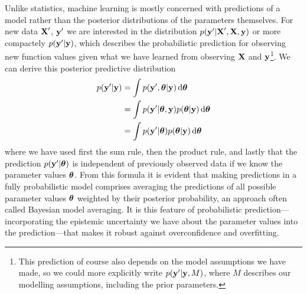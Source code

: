 \documentclass[../thesis.tex]{subfiles}
\begin{document}
Unlike statistics, machine learning is mostly concerned with predictions of a model rather than the posterior distributions of the parameters themselves. For new data $\boldsymbol{\mathbf{X}}'$, $\boldsymbol{\mathbf{y}}'$ we are interested in the distribution $p(\boldsymbol{\mathbf{y}}' | \boldsymbol{\mathbf{X}}', \boldsymbol{\mathbf{X}}, \boldsymbol{\mathbf{y}})$ or more compactely $p(\boldsymbol{\mathbf{y}}' | \boldsymbol{\mathbf{y}})$, which describes the probabilistic prediction for observing new function values given what we have learned from observing $\boldsymbol{\mathbf{X}}$ and $\boldsymbol{\mathbf{y}}$\footnote{This prediction of course also depends on the model assumptions we have made, so we could more explicitly write $p(\boldsymbol{\mathbf{y}}' | \boldsymbol{\mathbf{y}}, M)$, where $M$ describes our modelling assumptions, including the prior parameters.}. We can derive this posterior predictive distribution
\begin{equation}
    \begin{split}
        p(\boldsymbol{\mathbf{y}}' | \boldsymbol{\mathbf{y}}) &= \int p(\boldsymbol{\mathbf{y}}', \boldsymbol{\mathbf{\theta}} | \boldsymbol{\mathbf{y}}) \mathop{}\!\mathrm{d} \boldsymbol{\mathbf{\theta}} \\
        &=\int p(\boldsymbol{\mathbf{y}}' | \boldsymbol{\mathbf{\theta}}, \boldsymbol{\mathbf{y}}) p(\boldsymbol{\mathbf{\theta}} | \boldsymbol{\mathbf{y}}) \mathop{}\!\mathrm{d}\boldsymbol{\mathbf{\theta}} \\
        &= \int p(\boldsymbol{\mathbf{y}}' | \boldsymbol{\mathbf{\theta}}) p(\boldsymbol{\mathbf{\theta}} | \boldsymbol{\mathbf{y}}) \mathop{}\!\mathrm{d}\boldsymbol{\mathbf{\theta}}
    \end{split}
\end{equation}
where we have used first the sum rule, then the product rule, and lastly that the prediction $p(\boldsymbol{\mathbf{y}}' | \boldsymbol{\mathbf{\theta}})$ is independent of previously observed data if we know the parameter values $\boldsymbol{\mathbf{\theta}}$. From this formula it is evident that making predictions in a fully probabilistic model comprises averaging the predictions of all possible parameter values $\boldsymbol{\mathbf{\theta}}$ weighted by their posterior probability, an approach often called Bayesian model averaging. It is this feature of probabilistic prediction---incorporating the epistemic uncertainty we have about the parameter values into the prediction---that makes it robust against overconfidence and overfitting. 
\end{document}
